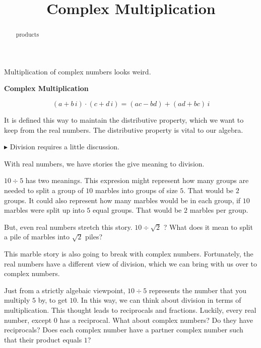 \documentclass{ximera}
\title{Complex Multiplication}
\begin{document}
\begin{abstract}
products
\end{abstract}
\maketitle


Multiplication of complex numbers looks weird.





\begin{definition} \textbf{\textcolor{green!50!black}{Complex Multiplication}}


\[    (a + b \, i) \cdot (c + d \, i) = (ac-bd) + (ad+bc) \, i           \]

\end{definition}


It is defined this way to maintain the distributive property, which we want to keep from the real numbers.  The distributive property is vital to our algebra.



$\blacktriangleright$ Division requires a little discussion.



With real numbers, we have stories the give meaning to division.


$10 \div 5$ has two meanings.  This expresion might represent how many groups are needed to split a group of $10$ marbles into groups of size $5$.  That would be $2$ groups.  It could also represent how many marbles would be in each group, if $10$ marbles were split up into $5$ equal groups.  That would be $2$ marbles per group.


But, even real numbers stretch this story.  $10 \div \sqrt{2}$ ?  What does it mean to split a pile of marbles into $\sqrt{2}$ piles?

This marble story is also going to break with complex numbers.  Fortunately, the real numbers have a different view of division, which we can bring with us over to complex numbers.





Just from a strictly algebaic viewpoint, $10 \div 5$ represents the number that you multiply $5$ by, to get $10$.  In this way, we can think about division in terms of multiplication.  This thought leads to reciprocals and fractions.  Luckily, every real number, except $0$ has a reciprocal.  What about complex numbers?  Do they have reciprocals?  Does each complex number have a partner complex number such that their product equals $1$?
\end{document}
